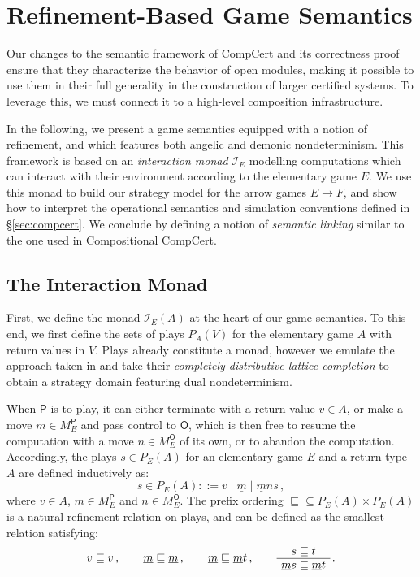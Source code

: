\documentclass[sigplan,10pt,review,anonymous]{acmart}
\newcommand{\kw}[1]{\ensuremath{ \mathsf{#1} }}
\begin{document}

\cbdelete

\section{Refinement-Based Game Semantics} \label{sec:gamesem} %

Our changes to the semantic framework of CompCert
and its correctness proof
ensure that they characterize the behavior of open modules,
making it possible to use them in their full generality
in the construction of larger certified systems.
To leverage this,
we must connect it to a high-level composition infrastructure.

In the following,
we present a game semantics equipped with a notion of refinement,
and which features both angelic and demonic nondeterminism.
This framework is based on an \emph{interaction monad} $\mathcal{I}_E$
modelling computations which can interact with their environment
according to the elementary game $E$.
We use this monad to build our strategy model for the
arrow games $E \rightarrow F$,
and show how to interpret the operational semantics
and simulation conventions defined in \S\ref{sec:compcert}.
We conclude by defining a notion of \emph{semantic linking}
similar to the one used in Compositional CompCert.

\subsection{The Interaction Monad} \label{sec:monad:def} %

First,
we define the monad $\mathcal{I}_E(A)$
at the heart of our game semantics.
To this end,
we first define the sets of plays $P_A(V)$
for the elementary game $A$ with return values in $V$.
Plays already constitute a monad,
however we emulate the approach taken in \cite{cspdnd}
and take their \emph{completely distributive lattice completion}
to obtain a strategy domain featuring dual nondeterminism.

When $\kw{P}$ is to play,
it can either terminate with a return value $v \in A$,
or make a move $m \in M_E^\kw{P}$ and pass control to $\kw{O}$,
which is then free to resume the computation with
a move $n \in M_E^\kw{O}$ of its own,
or to abandon the computation.
Accordingly,
the plays $s \in P_E(A)$
for an elementary game $E$ and a return type $A$
are defined inductively as:
\[
  s \in P_E(A) ::= v \mid \underline{m} \mid \underline{m} ns \,,
\]
where $v \in A$, $m \in M_E^\kw{P}$ and $n \in M_E^\kw{O}$.
The prefix ordering
${\sqsubseteq} \subseteq P_E(A) \times P_E(A)$
is a natural refinement relation on plays,
and can be defined
as the smallest relation satisfying:
\[
  v \sqsubseteq v \,, \qquad
  \underline{m} \sqsubseteq \underline{m} \,, \qquad
  \underline{m} \sqsubseteq \underline{m}t \,, \qquad
  \AxiomC{$s \sqsubseteq t$}
  \UnaryInfC{$\underline{m}s \sqsubseteq \underline{m}t$}
  \DisplayProof \,.
\]
\end{document}
